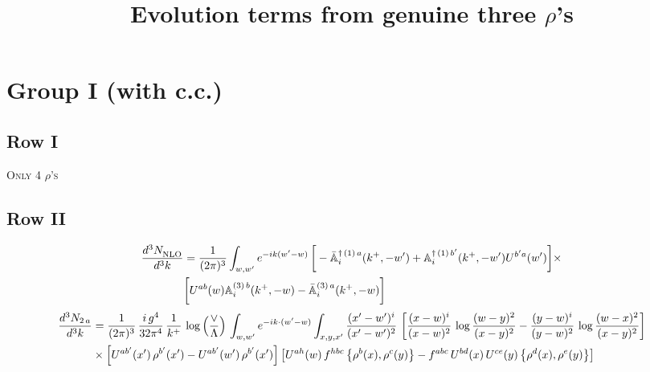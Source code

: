 \documentclass[9pt]{article}
\title{Evolution terms from genuine three $\rho$'s}
\author{}
\date{}
\def\mf#1{\mathbb{#1}}
\numberwithin{equation}{section}
\begin{document}
\maketitle
\section{Group I (with c.c.)}
\subsection{Row I}
\textsc{Only 4 $\rho$'s}
\subsection{Row II}
\begin{align}
    \frac{d^{3}N_{\rm NLO}^{\rm}}{d^{3}k} &  = \frac{1}{(2\pi)^{3}}  \int_{w, w^\prime} e^{-ik(w^\prime-w)}\,\bigg[-\bar{\mf{A}}^{\dagger\,(1)\,a}_{i}(k^{+},-w^{\prime})+\mf{A}^{\dagger\, (1)\, b^{\prime}}_{i}(k^{+},-w^{\prime})U^{b^{\prime}a}(w^{\prime})\bigg]\times \notag \\ & \bigg[U^{ab}(w)\mf{A}^{(3)\, b}_{i}(k^{+},- w)-\Bar{\mf{A}}^{(3)\, a}_{i}(k^{+}, - w)\bigg]\nonumber
\end{align}
\begin{align}
\frac{d^{3}N_{2\,a}}{d^{3}k} & = \frac{1}{(2\pi)^{3}}\,\frac{i\,g^{4}}{32\pi^{4}}\,\frac{1}{k^{+}}\,\log\left(\frac{\vee}{\Lambda}\right)\,\int_{w,w'} e^{-ik\cdot(w'-w)}\int_{x,y,x'}\frac{(x'-w')^{i}}{(x'-w')^{2}}\,\left[\frac{(x-w)^{i}}{(x-w)^{2}}\,\log\frac{(w-y)^{2}}{(x-y)^{2}}-\frac{(y-w)^{i}}{(y-w)^{2}}\,\log\frac{(w-x)^{2}}{(x-y)^{2}}\right]\notag\\
&\times\left[U^{ab'}(x')\,\rho^{b'}(x')-U^{ab'}(w')\,\rho^{b'}(x')\right]
\left[U^{ah}(w)\,f^{hbc}\left\{\rho^{b}(x),\rho^{c}(y)\right\}-f^{abc}\,U^{bd}(x)\,U^{ce}(y)\left\{\rho^{d}(x),\rho^{e}(y)\right\}\right]
\end{align}
\end{document}

